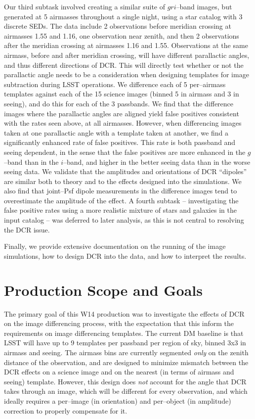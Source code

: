 \documentclass[prd, nofootinbib, floatfix, 11pt, tightenlines, times]{article}
\begin{document}
Our third subtask involved creating a similar suite of $gri$--band
images, but generated at 5 airmasses throughout a single night, using
a star catalog with 3 discrete SEDs.  The data include 2 observations
before meridian crossing at airmasses 1.55 and 1.16, one observation
near zenith, and then 2 observations after the meridian crossing at
airmasses 1.16 and 1.55.  Observations at the same airmass, before and
after meridian crossing, will have different parallactic angles, and
thus different directions of DCR.  This will directly test whether or
not the parallactic angle needs to be a consideration when designing
templates for image subtraction during LSST operations.  We difference
each of 5 per--airmass templates against each of the 15 science images
(binned 5 in airmass and 3 in seeing), and do this for each of the 3
passbands.  We find that the difference images where the parallactic
angles are aligned yield false positives consistent with the rates
seen above, at all airmasses.  However, when differencing images taken
at one parallactic angle with a template taken at another, we find a
significantly enhanced rate of false positives.  This rate is both
passband and seeing dependent, in the sense that the false positives
are more enhanced in the $g$--band than in the $i$--band, and higher
in the better seeing data than in the worse seeing data.  We validate
that the amplitudes and orientations of DCR ``dipoles'' are similar
both to theory and to the effects designed into the simulations.  We
also find that joint--Psf dipole measurements in the difference images
tend to overestimate the amplitude of the effect.  A fourth subtask --
investigating the false positive rates using a more realistic mixture
of stars and galaxies in the input catalog -- was deferred to later
analysis, as this is not central to resolving the DCR issue.

Finally, we provide extensive documentation on the running of the
image simulations, how to design DCR into the data, and how to
interpret the results.  

\clearpage
\tableofcontents
\clearpage

\section{Production Scope and Goals}

The primary goal of this W14 production was to investigate the effects
of DCR on the image differencing process, with the expectation that
this inform the requirements on image differencing templates.  The
current DM baseline is that LSST will have up to 9 templates per
passband per region of sky, binned 3x3 in airmass and seeing.  The
airmass bins are currently segmented {\it only} on the zenith distance
of the observation, and are designed to minimize mismatch between the
DCR effects on a science image and on the nearest (in terms of airmass
and seeing) template.  However, this design does {\it not} account for
the angle that DCR takes through an image, which will be different for
every observation, and which ideally requires a per--image (in
orientation) and per--object (in amplitude) correction to properly
compensate for it.
\end{document}
